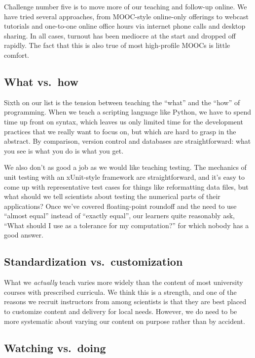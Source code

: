 \documentclass[10pt,a4paper,twocolumn]{article}
\begin{document}
Challenge number five is to move more of our teaching and follow-up
online. We have tried several approaches, from MOOC-style online-only
offerings to webcast tutorials and one-to-one online office hours via
internet phone calls and desktop sharing. In all cases, turnout has
been mediocre at the start and dropped off rapidly. The fact that this
is also true of most high-profile MOOCs is little comfort.

\subsection*{What vs.~how}

Sixth on our list is the tension between teaching the ``what'' and the
``how'' of programming. When we teach a scripting language like Python,
we have to spend time up front on syntax, which leaves us only limited
time for the development practices that we really want to focus on, but
which are hard to grasp in the abstract. By comparison, version control
and databases are straightforward: what you see is what you do is what
you get.

We also don't as good a job as we would like teaching testing. The
mechanics of unit testing with an xUnit-style framework are
straightforward, and it's easy to come up with representative test cases
for things like reformatting data files, but what should we tell
scientists about testing the numerical parts of their applications? Once
we've covered floating-point roundoff and the need to use ``almost
equal'' instead of ``exactly equal'', our learners quite reasonably ask,
``What should I use as a tolerance for my computation?'' for which
nobody has a good answer.

\subsection*{Standardization vs.~customization}

What we \emph{actually} teach varies more widely than the content of
most university courses with prescribed curricula. We think this is a
strength, and one of the reasons we recruit instructors from among
scientists is that they are best placed to customize content and
delivery for local needs. However, we do need to be more systematic
about varying our content on purpose rather than by accident.

\subsection*{Watching vs.~doing}
\end{document}
